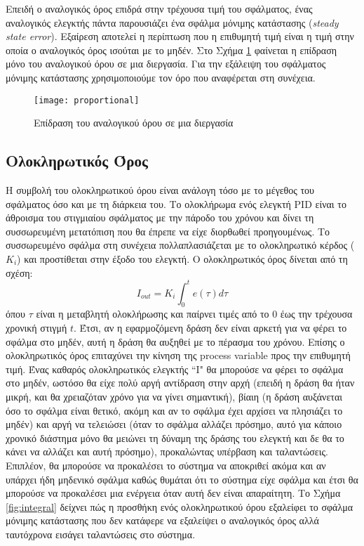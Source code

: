 Επειδή ο αναλογικός όρος επιδρά στην τρέχουσα τιμή του σφάλματος, ένας αναλογικός ελεγκτής πάντα παρουσιάζει ένα σφάλμα μόνιμης κατάστασης (\emph{steady state error}). Εξαίρεση αποτελεί η περίπτωση που η επιθυμητή τιμή είναι η τιμή στην οποία ο αναλογικός όρος ισούται με το μηδέν. Στο Σχήμα \ref{fig:proportional} φαίνεται η επίδραση μόνο του αναλογικού όρου σε μια διεργασία. Για την εξάλειψη του σφάλματος μόνιμης κατάστασης χρησιμοποιούμε τον όρο που αναφέρεται στη συνέχεια.

\begin{figure}[h]
  \centering
  \texttt{[image: proportional]}
  \caption{Επίδραση του αναλογικού όρου σε μια διεργασία}
  \label{fig:proportional}
\end{figure}

\subsection{Ολοκληρωτικός Όρος}

Η συμβολή του ολοκληρωτικού όρου είναι ανάλογη τόσο με το μέγεθος του σφάλματος όσο και με τη διάρκεια του. Το ολοκλήρωμα ενός ελεγκτή PID είναι το άθροισμα του στιγμιαίου σφάλματος με την πάροδο του χρόνου και δίνει τη συσσωρευμένη μετατόπιση που θα έπρεπε να είχε διορθωθεί προηγουμένως. Το συσσωρευμένο σφάλμα στη συνέχεια πολλαπλασιάζεται με το ολοκληρωτικό κέρδος ($K_i$) και προστίθεται στην έξοδο του ελεγκτή. Ο ολοκληρωτικός όρος δίνεται από τη σχέση:
\begin{equation}
I_{out}=K_i \int_{0}^{t} e(\tau)d\tau
\label{eq:i_out}
\end{equation}
όπου $\tau$ είναι η μεταβλητή ολοκλήρωσης και παίρνει τιμές από το $0$ έως την τρέχουσα χρονική στιγμή $t$. Έτσι, αν η εφαρμοζόμενη δράση δεν είναι αρκετή για να φέρει το σφάλμα στο μηδέν, αυτή η δράση θα αυξηθεί με το πέρασμα του χρόνου. Επίσης ο ολοκληρωτικός όρος επιταχύνει την κίνηση της process variable προς την επιθυμητή τιμή. Ένας καθαρός ολοκληρωτικός ελεγκτής ``I" θα μπορούσε να φέρει το σφάλμα στο μηδέν, ωστόσο θα είχε πολύ αργή αντίδραση στην αρχή (επειδή η δράση θα ήταν μικρή, και θα χρειαζόταν χρόνο για να γίνει σημαντική), βίαιη (η δράση αυξάνεται όσο το σφάλμα είναι θετικό, ακόμη και αν το σφάλμα έχει αρχίσει να πλησιάζει το μηδέν) και αργή να τελειώσει (όταν το σφάλμα αλλάζει πρόσημο, αυτό για κάποιο χρονικό διάστημα μόνο θα μειώνει τη δύναμη της δράσης του ελεγκτή και δε θα το κάνει να αλλάζει και αυτή πρόσημο), προκαλώντας υπέρβαση και ταλαντώσεις. Επιπλέον, θα μπορούσε να προκαλέσει το σύστημα να αποκριθεί ακόμα και αν υπάρχει ήδη μηδενικό σφάλμα καθώς θυμάται ότι το σύστημα είχε σφάλμα και έτσι θα μπορούσε να προκαλέσει μια ενέργεια όταν αυτή δεν είναι απαραίτητη. Το Σχήμα \ref{fig:integral} δείχνει πώς η προσθήκη ενός ολοκληρωτικού όρου εξαλείφει το σφάλμα μόνιμης κατάστασης που δεν κατάφερε να εξαλείψει ο αναλογικός όρος αλλά ταυτόχρονα εισάγει ταλαντώσεις στο σύστημα.


